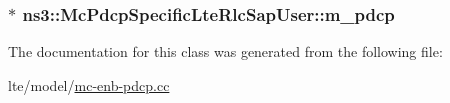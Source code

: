 \subsubsection[{\texorpdfstring{m\+\_\+pdcp}{m_pdcp}}]{$\ast$ ns3\+::\+Mc\+Pdcp\+Specific\+Lte\+Rlc\+Sap\+User\+::m\+\_\+pdcp\hspace{0.3cm}{\ttfamily [private]}}\hypertarget{classns3_1_1McPdcpSpecificLteRlcSapUser_a7978a417a1d341d932827d5a8c8e52bf}{}\label{classns3_1_1McPdcpSpecificLteRlcSapUser_a7978a417a1d341d932827d5a8c8e52bf}


The documentation for this class was generated from the following file\+:\begin{DoxyCompactItemize}
\item 
lte/model/\hyperlink{mc-enb-pdcp_8cc}{mc-\/enb-\/pdcp.\+cc}\end{DoxyCompactItemize}
